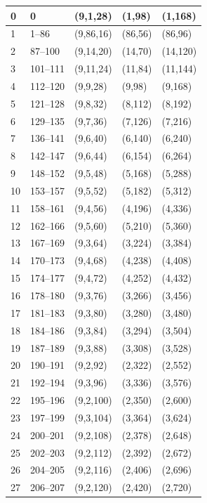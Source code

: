 \documentclass[report.tex]{subfiles}
\begin{document}
\begin{table}[ht]
\begin{tabular}{ |l|l|l|l|l| }
0 & 0 & (9,1,28) & (1,98) & (1,168) \\
\hline
1 & 1--86 & (9,86,16) & (86,56) & (86,96) \\
\hline
2 & 87--100 & (9,14,20) & (14,70) & (14,120) \\
\hline
3 & 101--111 & (9,11,24) & (11,84) & (11,144) \\
\hline
4 & 112--120 & (9,9,28) & (9,98) & (9,168) \\
\hline
5 & 121--128 & (9,8,32) & (8,112) & (8,192) \\
\hline
6 & 129--135 & (9,7,36) & (7,126) & (7,216) \\
\hline
7 & 136--141 & (9,6,40) & (6,140) & (6,240) \\
\hline
8 & 142--147 & (9,6,44) & (6,154) & (6,264) \\
\hline
9 & 148--152 & (9,5,48) & (5,168) & (5,288) \\
\hline
10 & 153--157 & (9,5,52) & (5,182) & (5,312) \\
\hline
11 & 158--161 & (9,4,56) & (4,196) & (4,336) \\
\hline
12 & 162--166 & (9,5,60) & (5,210) & (5,360) \\
\hline
13 & 167--169 & (9,3,64) & (3,224) & (3,384) \\
\hline
14 & 170--173 & (9,4,68) & (4,238) & (4,408) \\
\hline
15 & 174--177 & (9,4,72) & (4,252) & (4,432) \\
\hline
16 & 178--180 & (9,3,76) & (3,266) & (3,456) \\
\hline
17 & 181--183 & (9,3,80) & (3,280) & (3,480) \\
\hline
18 & 184--186 & (9,3,84) & (3,294) & (3,504) \\
\hline
19 & 187--189 & (9,3,88) & (3,308) & (3,528) \\
\hline
20 & 190--191 & (9,2,92) & (2,322) & (2,552) \\
\hline
21 & 192--194 & (9,3,96) & (3,336) & (3,576) \\
\hline
22 & 195--196 & (9,2,100) & (2,350) & (2,600) \\
\hline
23 & 197--199 & (9,3,104) & (3,364) & (3,624) \\
\hline
24 & 200--201 & (9,2,108) & (2,378) & (2,648) \\
\hline
25 & 202--203 & (9,2,112) & (2,392) & (2,672) \\
\hline
26 & 204--205 & (9,2,116) & (2,406) & (2,696) \\
\hline
27 & 206--207 & (9,2,120) & (2,420) & (2,720) \\

\end{tabular}
\end{table}
\end{document}
